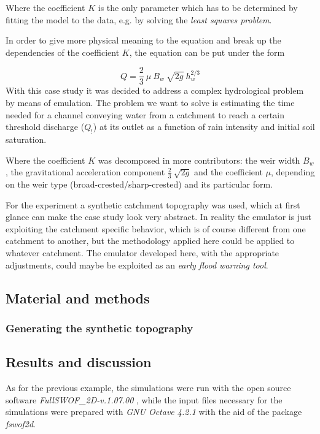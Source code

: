 \noindent Where the coefficient $K$ is the only parameter which has to be determined by fitting the model to the data, e.g. by solving the \emph{least squares problem}.

In order to give more physical meaning to the equation and break up the dependencies of the coefficient $K$, the equation can be put under the form

\begin{equation}
  Q = \frac{2}{3}\: \mu\: B_w\: \sqrt{2g}\: h_w^{2/3}
\end{equation}
With this case study it was decided to address a complex hydrological problem by means of emulation.
The problem we want to solve is estimating the time needed for a channel conveying water from a catchment to reach a certain threshold discharge ($Q_!$) at its outlet as a function of rain intensity and initial soil saturation.

\noindent Where the coefficient $K$ was decomposed in more contributors: the weir width $B_w$, the gravitational acceleration component $\frac{2}{3}\: \sqrt{2g}$  and the coefficient $\mu$, depending on the weir type (broad-crested/sharp-crested) and its particular form.


For the experiment a synthetic catchment topography was used, which at first glance can make the case study look very abstract.
In reality the emulator is just exploiting the catchment specific behavior, which is of course different from one catchment to another, but the methodology applied here could be applied to whatever catchment.
The emulator developed here, with the appropriate adjustments, could maybe be exploited as an \emph{early flood warning tool}.

\subsection{Material and methods}

\subsubsection{Generating the synthetic topography}

\subsection{Results and discussion}
As for the previous example, the simulations were run with the open source software \textit{FullSWOF\_2D-v.1.07.00} \autocite{delestre_fullswof:_2014} , while the input files necessary for the simulations were prepared with \textit{GNU Octave 4.2.1} \autocite{octave_community_gnu_2018}  with the aid of the package \textit{fswof2d}.

